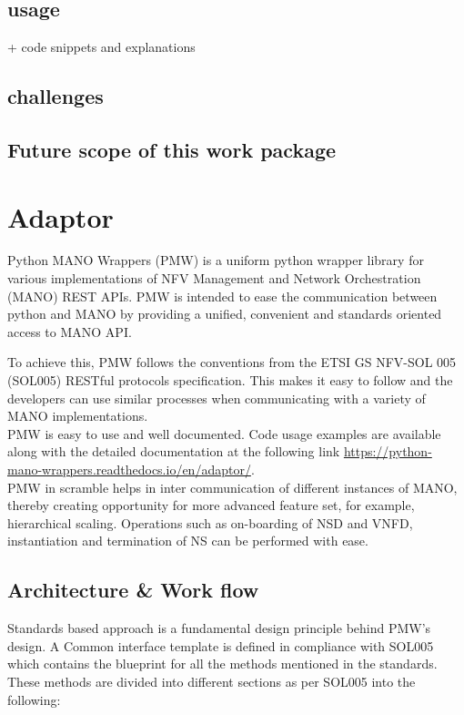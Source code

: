\subsection{usage}

+ code snippets and explanations

\subsection{challenges}
\subsection{Future scope of this work package}

\section{Adaptor}
Python MANO Wrappers (PMW) is a uniform python wrapper library for various implementations of NFV Management and Network Orchestration (MANO) REST APIs. PMW is intended to ease the communication between python and MANO by providing a unified, convenient and standards oriented access to MANO API.

To achieve this, PMW follows the conventions from the ETSI GS NFV-SOL 005 (SOL005) RESTful protocols specification. This makes it easy to follow and the developers can use similar processes when communicating with a variety of MANO implementations.\\

PMW is easy to use and well documented. Code usage examples are available along with the detailed documentation at the following link \url{https://python-mano-wrappers.readthedocs.io/en/adaptor/}. \\

PMW in scramble helps in inter communication of different instances of MANO, thereby creating opportunity for more advanced feature set, for example, hierarchical scaling. Operations such as on-boarding of NSD and VNFD, instantiation and termination of NS can be performed with ease.

\subsection{Architecture \& Work flow}
Standards based approach is a fundamental design principle behind PMW's design. A Common interface template is defined in compliance with SOL005 which contains the blueprint for all the methods mentioned in the standards. These methods are divided into different sections as per SOL005 into the following:

